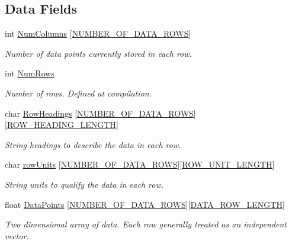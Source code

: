 \subsection*{Data Fields}
\begin{DoxyCompactItemize}
\item 
int \mbox{\hyperlink{struct_data_ab7ad5d3d8f1e4b3f42c5aedb1e74b336}{Num\+Columns}} \mbox{[}\mbox{\hyperlink{_s_p_i___instruction_set_8h_a030a0b94acdc35db8cf20a5044a1c775}{N\+U\+M\+B\+E\+R\+\_\+\+O\+F\+\_\+\+D\+A\+T\+A\+\_\+\+R\+O\+WS}}\mbox{]}
\begin{DoxyCompactList}\small\item\em Number of data points currently stored in each row. \end{DoxyCompactList}\item 
int \mbox{\hyperlink{struct_data_ac0883de785701631da0e099578c748ca}{Num\+Rows}}
\begin{DoxyCompactList}\small\item\em Number of rows. Defined at compilation. \end{DoxyCompactList}\item 
char \mbox{\hyperlink{struct_data_a653f4e0cb59f5c3f36f5664be1f11c01}{Row\+Headings}} \mbox{[}\mbox{\hyperlink{_s_p_i___instruction_set_8h_a030a0b94acdc35db8cf20a5044a1c775}{N\+U\+M\+B\+E\+R\+\_\+\+O\+F\+\_\+\+D\+A\+T\+A\+\_\+\+R\+O\+WS}}\mbox{]}\mbox{[}\mbox{\hyperlink{_s_p_i___instruction_set_8h_a63a97a0fe356d1b3030dfb633e0d0b8e}{R\+O\+W\+\_\+\+H\+E\+A\+D\+I\+N\+G\+\_\+\+L\+E\+N\+G\+TH}}\mbox{]}
\begin{DoxyCompactList}\small\item\em String headings to describe the data in each row. \end{DoxyCompactList}\item 
char \mbox{\hyperlink{struct_data_a004891d89fb41172310a55947f922a54}{row\+Units}} \mbox{[}\mbox{\hyperlink{_s_p_i___instruction_set_8h_a030a0b94acdc35db8cf20a5044a1c775}{N\+U\+M\+B\+E\+R\+\_\+\+O\+F\+\_\+\+D\+A\+T\+A\+\_\+\+R\+O\+WS}}\mbox{]}\mbox{[}\mbox{\hyperlink{_s_p_i___instruction_set_8h_af45194e4246701e52a2d67f27cc3ffb8}{R\+O\+W\+\_\+\+U\+N\+I\+T\+\_\+\+L\+E\+N\+G\+TH}}\mbox{]}
\begin{DoxyCompactList}\small\item\em String units to qualify the data in each row. \end{DoxyCompactList}\item 
float \mbox{\hyperlink{struct_data_a1984363a7b509590c1bae03601360a0e}{Data\+Points}} \mbox{[}\mbox{\hyperlink{_s_p_i___instruction_set_8h_a030a0b94acdc35db8cf20a5044a1c775}{N\+U\+M\+B\+E\+R\+\_\+\+O\+F\+\_\+\+D\+A\+T\+A\+\_\+\+R\+O\+WS}}\mbox{]}\mbox{[}\mbox{\hyperlink{_s_p_i___instruction_set_8h_afaade7aab877c51eaea08012fa5a7ce2}{D\+A\+T\+A\+\_\+\+R\+O\+W\+\_\+\+L\+E\+N\+G\+TH}}\mbox{]}
\begin{DoxyCompactList}\small\item\em Two dimensional array of data. Each row generally treated as an independent vector. \end{DoxyCompactList}\end{DoxyCompactItemize}


